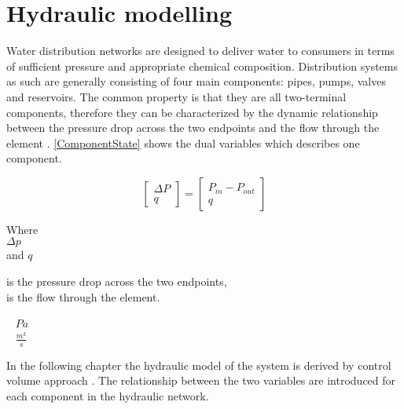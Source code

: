 \section{Hydraulic modelling}
\label{HydraulicModel}


Water distribution networks are designed to deliver water to consumers in terms of sufficient pressure and appropriate chemical composition. Distribution systems as such are generally consisting of four main components: pipes, pumps, valves and reservoirs. The common property is that they are all two-terminal components, therefore they can be characterized by the dynamic relationship between the pressure drop across the two endpoints and the flow through the element \cite{Kallesoe2009}.  \eqref{ComponentState} shows the dual variables which describes one component. 

\begin{equation}
\label{ComponentState}
 \begin{bmatrix}
    \Delta P \\
    q
\end{bmatrix}
=
 \begin{bmatrix}
    P_{in} - P_{out} \\
    q
\end{bmatrix}
\end{equation}

 \begin{minipage}[t]{0.20\textwidth}
Where\\
\hspace*{8mm} $\Delta p$ \\
and \hspace*{0.7mm} $q$ 
\end{minipage}
\begin{minipage}[t]{0.68\textwidth}
\vspace*{2mm}
is the pressure drop across the two endpoints,\\
is the flow through the element.
\end{minipage}
\begin{minipage}[t]{0.10\textwidth}
\vspace*{2mm}
\textcolor{White}{te}$\unit{Pa}$\\
\textcolor{White}{te}$\unit{\frac{m^{3}}{s}}$
\end{minipage}

In the following chapter the hydraulic model of the system is derived by control volume approach \cite{Hunt_Fluidmechanics}. The relationship between the two variables are introduced for each component in the hydraulic network.

